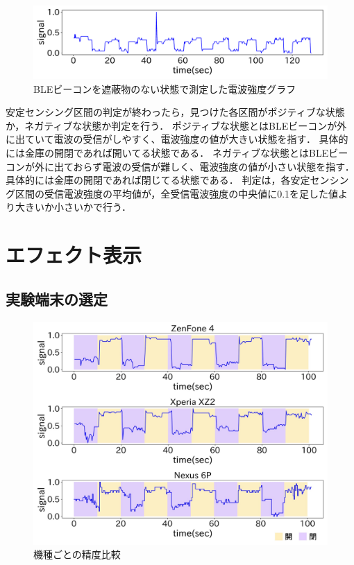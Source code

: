 \begin{figure}[tbh]
    \centering
    \includegraphics[width=14cm]{images/chapter3/bokoboko.pdf}
    \caption{BLEビーコンを遮蔽物のない状態で測定した電波強度グラフ}
    \label{nomal-data}
\end{figure}

安定センシング区間の判定が終わったら，見つけた各区間がポジティブな状態か，ネガティブな状態か判定を行う．
ポジティブな状態とはBLEビーコンが外に出ていて電波の受信がしやすく、電波強度の値が大きい状態を指す．
具体的には金庫の開閉であれば開いてる状態である．
ネガティブな状態とはBLEビーコンが外に出ておらず電波の受信が難しく、電波強度の値が小さい状態を指す．
具体的には金庫の開閉であれば閉じてる状態である．
判定は，各安定センシング区間の受信電波強度の平均値が，全受信電波強度の中央値に0.1を足した値より大きいか小さいかで行う．


\section{エフェクト表示}



\subsection{実験端末の選定}

\begin{figure}[tbh]
    \centering
    \includegraphics[width=14cm]{images/chapter3/mix.jpg}
    \caption{機種ごとの精度比較}
    \label{multi-data}
\end{figure}

